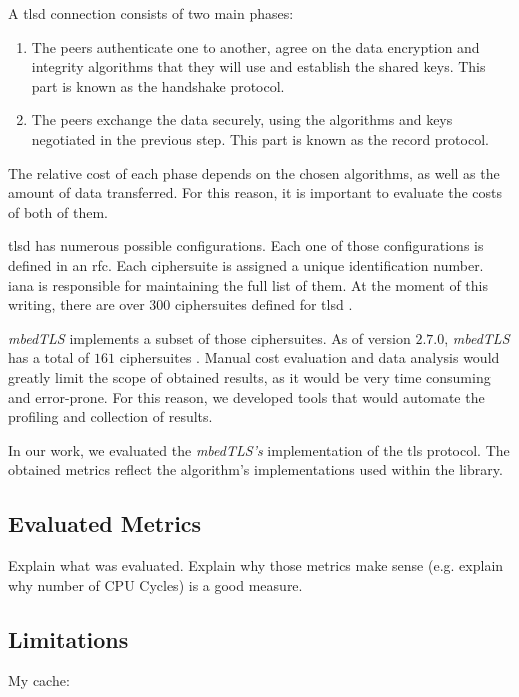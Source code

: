\documentclass{llncs}
\begin{document}
A \gls{tlsd} connection consists of two main phases:
\begin{enumerate}
  \item The peers authenticate one to another, agree on the data encryption and integrity 
  algorithms that they will use and establish the shared keys. This part is known as the handshake protocol.
 \item The peers exchange the data securely, using the algorithms and keys negotiated in 
the previous step. This part is known as the record protocol.
\end{enumerate}

The relative cost of each phase depends on the chosen algorithms, as well as the amount of data
transferred. For this reason, it is important to evaluate the costs of both of them.

\acrshort{tlsd} has numerous possible configurations. Each one of those configurations is defined
in an \gls{rfc}. Each ciphersuite is assigned a unique identification number. \gls{iana} is responsible for
maintaining the full list of them. At the moment of this writing, there are over $300$ ciphersuites
defined for \gls{tlsd} \cite{IANA_ciphers_list:online}.

\textit{mbedTLS} implements a subset of those ciphersuites. As of version $2.7.0$, \textit{mbedTLS}
has a total of $161$ ciphersuites \cite{mbedTLS_ciphers_list:online}. Manual cost evaluation and
data analysis would greatly limit the scope of obtained results, as it would be very time consuming 
and error-prone. For this reason, we developed tools that would automate the profiling and collection 
of results.

In our work, we evaluated the \textit{mbedTLS's} implementation of the \gls{tls} protocol. The obtained
metrics reflect the algorithm's implementations used within the library.


\subsection{Evaluated Metrics}

Explain what was evaluated. Explain why those metrics make sense (e.g. explain why number of CPU Cycles)
is a good measure.

\subsection{Limitations}

My cache:
\end{document}
